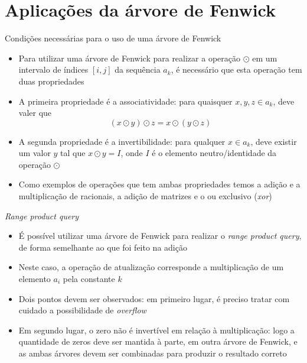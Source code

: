 \section{Aplicações da árvore de Fenwick}

\begin{frame}[fragile]{Condições necessárias para o uso de uma árvore de Fenwick}

    \begin{itemize}
        \item Para utilizar uma árvore de Fenwick para realizar a operação $\odot$ em um
            intervalo de índices $[i,j]$ da sequência $a_k$, é necessário que esta operação
            tem duas propriedades

        \item A primeira propriedade é a associatividade: para quaisquer $x, y, z \in a_k$,
            deve valer que
        \[
            (x \odot y)\odot z = x \odot (y \odot z)
        \]

        \item A segunda propriedade é a invertibilidade: para qualquer $x \in a_k$, deve existir
            um valor $y$ tal que $x\odot y = I$, onde $I$ é o elemento 
            neutro/identidade da operação $\odot$

        \item Como exemplos de operações que tem ambas propriedades temos a adição e a multiplicação
            de racionais, a adição de matrizes e o ou exclusivo (\textit{xor})
    \end{itemize}

\end{frame}

\begin{frame}[fragile]{\textit{Range product query}}

    \begin{itemize}
        \item É possível utilizar uma árvore de Fenwick para realizar o \textit{range product
            query}, de forma semelhante ao que foi  feito na adição

        \item Neste caso, a operação de atualização corresponde a multiplicação de um elemento 
            $a_i$ pela constante $k$

        \item Dois pontos devem ser observados: em primeiro lugar, é preciso tratar com cuidado a 
            possibilidade de \textit{overflow} 

        \item Em segundo lugar, o zero não é invertível em relação à multiplicação: logo a
            quantidade de zeros deve ser mantida à parte, em outra árvore de Fenwick, e as
            ambas árvores devem ser combinadas para produzir o resultado correto
    \end{itemize}

\end{frame}

